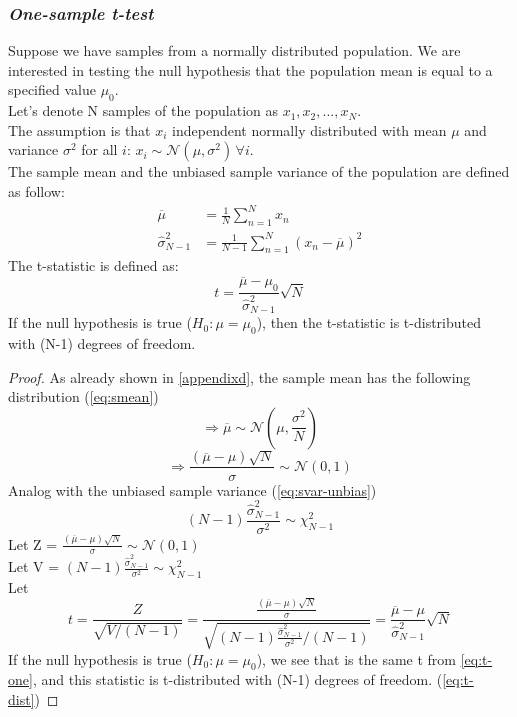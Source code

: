 \subsubsection{\it One-sample t-test}
\begin{definition}
	Suppose we have samples from a normally distributed population. We are interested in testing the null hypothesis that the population mean is equal to a specified value $\mu_0$.\\
	Let's denote N samples of the population as $x_1, x_2, ..., x_N$. \\
	The assumption is that $x_i$ independent normally distributed with mean $\mu$ and variance $\sigma^2$ for all $i$: $x_i \sim \mathcal {N}(\mu,\sigma^2) \, \forall i$.
	\\	
	The sample mean and the unbiased sample variance of the population are defined as follow:
	\begin{align*}
		\overline \mu 			& = \frac{1}{N} \sum_{n=1}^N x_n \\
		\hat{\sigma}^2_{N-1} 	& = \frac{1}{N-1} \sum_{n=1}^N (x_n - \overline \mu)^2
	\end{align*}
	The t-statistic is defined as:
	\begin{equation} \label{eq:t-one}
		t = \frac{\overline \mu - \mu_0}{\hat{\sigma}^2_{N-1}} \sqrt{N}
	\end{equation}
	If the null hypothesis is true ($H_0: \mu = \mu_0$), then the t-statistic is t-distributed with (N-1) degrees of freedom.
\end{definition}
\begin{proof}
	As already shown in \autoref{appendixd}, the sample mean has the following distribution (\autoref{eq:smean})
	\begin{equation}
		\Rightarrow \overline \mu\sim \mathcal {N}(\mu,\frac{\sigma^2}{N}) \nonumber
	\end{equation}
	\begin{equation}
		\Rightarrow \frac{(\overline \mu - \mu)\sqrt{N}}{\sigma} \sim \mathcal {N}(0,1) \nonumber
	\end{equation}
	Analog with the unbiased sample variance (\autoref{eq:svar-unbias})
	\begin{equation}
		(N-1) \frac{\hat{\sigma}_{N-1}^2}{\sigma^2} \sim\chi^2_{N-1} \nonumber
	\end{equation}
	Let Z = $\frac{(\overline \mu - \mu)\sqrt{N}}{\sigma} \sim \mathcal {N}(0,1) $ \\
	Let V = $(N-1) \frac{\hat{\sigma}_{N-1}^2}{\sigma^2} \sim\chi^2_{N-1}$ \\
	Let
	\begin{equation}
		t = \frac{Z}{\sqrt{V/(N-1)} } = \frac{ \frac{(\overline \mu - \mu)\sqrt{N}}{\sigma} }{ \sqrt{(N-1) \frac{\hat{\sigma}_{N-1}^2}{\sigma^2} / (N-1)} } = 
		\frac{\overline \mu - \mu}{\hat{\sigma}^2_{N-1}} \sqrt{N} \nonumber
	\end{equation}	
	If the null hypothesis is true ($H_0: \mu = \mu_0$), we see that is the same t from \autoref{eq:t-one}, and this statistic is t-distributed with (N-1) degrees of freedom. (\autoref{eq:t-dist})
\end{proof}
